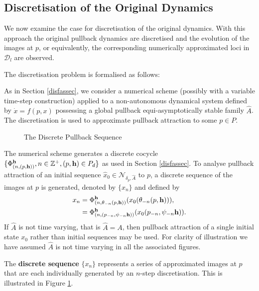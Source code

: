 \subsection{Discretisation of the Original Dynamics }

We now examine the case for discretisation of the original dynamics.
With this approach the original pullback dynamics are discretised and the
evolution of the images at $p$, or equivalently, the corresponding numerically
approximated loci in $\mathcal{D}_l$ are observed.

The discretisation problem is formalised as follows:

As in Section \ref{disfassec}, we consider a numerical
scheme (possibly with a variable time-step construction) applied
to a non-autonomous dynamical system defined by $\dot{x} = f(p,
x)$ possessing a global pullback equi-asymptotically stable family
$\hat{A}$. The discretisation is used to approximate pullback
attraction to some $p \in P$.

\begin{figure}[htb]
\begin{center}
 \caption{The Discrete Pullback Sequence}
\protect\label{pdisc0}
\end{center}
\end{figure}

The numerical scheme generates a discrete cocycle $\{ \Phi^{{\bf
h}}_{(n,(p, {\bf h}))}, n \in \mathbb{Z}^+, (p, {\bf h}) \in
P_d \}$ as used in Section \ref{disfassec}. To
analyse pullback attraction of an initial sequence $\hat{x}_0 \in
\mathcal{N}_{\delta_p, \hat{A}}$ to $p$, a discrete sequence  of the images
at $p$ is generated, denoted by $\{ x_n \}$ and defined by
\begin{align}
  \label{disseqeq}
  x_n &= \Phi^{{\bf h}}_{(n, \theta_{-n}(p, {\bf h}))}(x_0(\theta_{-n}(p, {\bf
                h}))), \nonumber \\
          &= \Phi^{{\bf h}}_{(n, (p_{-n},\psi_{-n}{\bf
                h}))}(x_0(p_{-n},\psi_{-n}{\bf    h})).
\end{align}
If $\hat{A}$ is not time varying, that is $\hat{A} = A$, then
pullback attraction of a single initial state $x_0$ rather than
initial sequences may be used. For clarity of illustration we have
assumed $\hat{A}$ is not time varying in all the associated
figures.

The {\bf discrete sequence} $\{ x_n \}$ represents a series of approximated
images at $p$ that are each individually generated by an $n$-step
discretisation. This is illustrated in Figure \ref{pdisc0}.

